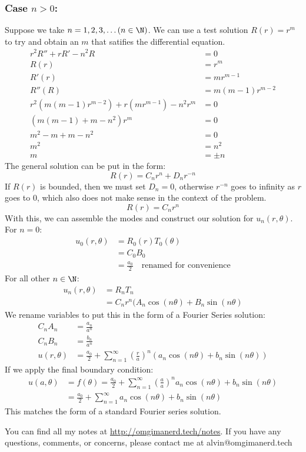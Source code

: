 \documentclass{math}
\begin{document}
\subsubsection*{Case \( n > 0 \):}
Suppose we take \( n = 1,2,3,\dots (n\in\N) \). We can use a test solution
\( R(r) = r^m \) to try and obtain an \( m \) that satifies the differential
equation.
\begin{align*}
  r^2R''+rR'-n^2R &= 0 \\
  R(r) &= r^m \\
  R'(r) &= mr^{m-1} \\
  R''(R) &= m(m-1)r^{m-2} \\
  r^2(m(m-1)r^{m-2})+r(mr^{m-1})-n^2r^m &= 0 \\
  (m(m-1)+m-n^2)r^m &= 0 \\
  m^2-m+m-n^2 &= 0 \\
  m^2 &= n^2 \\
  m &= \pm n
\end{align*}
The general solution can be put in the form:
\[ R(r) = C_nr^n+D_nr^{-n} \]
If \( R(r) \) is bounded, then we must set \( D_n = 0 \), otherwise \( r^{-n} \)
goes to infinity as \( r \) goes to 0, which also does not make sense in the
context of the problem.
\[ R(r) = C_nr^n \]
With this, we can assemble the modes and construct our solution for
\( u_n(r,\theta) \). For \( n = 0 \):
\begin{align*}
  u_0(r,\theta) &= R_0(r)T_0(\theta) \\
  &= C_0B_0 \\
  &= \frac{a_0}{2} \quad \text{renamed for convenience}
\end{align*}
For all other \( n\in\N \):
\begin{align*}
  u_n(r,\theta) &= R_nT_n \\
  &= C_nr^n(A_n\cos(n\theta)+B_n\sin(n\theta)
\end{align*}
We rename variables to put this in the form of a Fourier Series solution:
\begin{align*}
  C_nA_n &= \frac{a_n}{a^n} \\
  C_nB_n &= \frac{b_n}{a^n} \\
  u(r,\theta) &= \frac{a_0}{2}+\sum_{n=1}^{\infty}(\frac{r}{a})^n
    (a_n\cos(n\theta)+b_n\sin(n\theta))
\end{align*}
If we apply the final boundary condition:
\begin{align*}
  u(a,\theta) &= f(\theta) =
    \frac{a_0}{2}+\sum_{n=1}^{\infty}(\frac{a}{a})^n
      a_n\cos(n\theta)+b_n\sin(n\theta) \\
  &= \frac{a_0}{2}+\sum_{n=1}^{\infty}a_n\cos(n\theta)+b_n\sin(n\theta)
\end{align*}
This matches the form of a standard Fourier series solution.

\begin{center}
  You can find all my notes at \url{http://omgimanerd.tech/notes}. If you have
  any questions, comments, or concerns, please contact me at
  alvin@omgimanerd.tech
\end{center}
\end{document}
